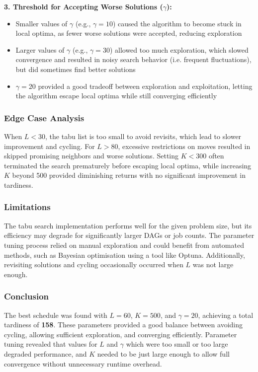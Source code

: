 \documentclass[fleqn]{article}
\begin{document}
    \textbf{3. Threshold for Accepting Worse Solutions ($\gamma$):}
    \begin{itemize}
        \item Smaller values of $\gamma$ (e.g., $\gamma=10$) caused the algorithm to become stuck in local optima, as fewer worse solutions were accepted, reducing exploration
        \item Larger values of $\gamma$ (e.g., $\gamma=30$) allowed too much exploration, which slowed convergence and resulted in noisy search behavior (i.e. frequent fluctuations), but did sometimes find better solutions
        \item $\gamma=20$ provided a good tradeoff between exploration and exploitation, letting the algorithm escape local optima while still converging efficiently
    \end{itemize}

    \subsubsection*{Edge Case Analysis}
    When \(L < 30\), the tabu list is too small to avoid revisits, which lead to slower improvement and cycling.
    For \(L > 80\), excessive restrictions on moves resulted in skipped promising neighbors and worse solutions.
    Setting \(K < 300\) often terminated the search prematurely before escaping local optima, while increasing \(K\) beyond
    500 provided diminishing returns with no significant improvement in tardiness.
    
    \subsubsection*{Limitations}
    The tabu search implementation performs well for the given problem size, but its efficiency may degrade for
    significantly larger DAGs or job counts. The parameter tuning process relied on manual exploration and could benefit
    from automated methods, such as Bayesian optimisation using a tool like Optuna. Additionally, revisiting solutions and
    cycling occasionally occurred when \(L\) was not large enough.

    \subsubsection*{Conclusion}
    The best schedule was found with $L=60$, $K=500$, and $\gamma=20$, achieving a total tardiness of \textbf{158}.
    These parameters provided a good balance between avoiding cycling, allowing sufficient exploration, and converging efficiently.
    Parameter tuning revealed that values for $L$ and $\gamma$ which were too small or too large degraded performance,
    and $K$ needed to be just large enough to allow full convergence without unnecessary runtime overhead.
\end{document}
